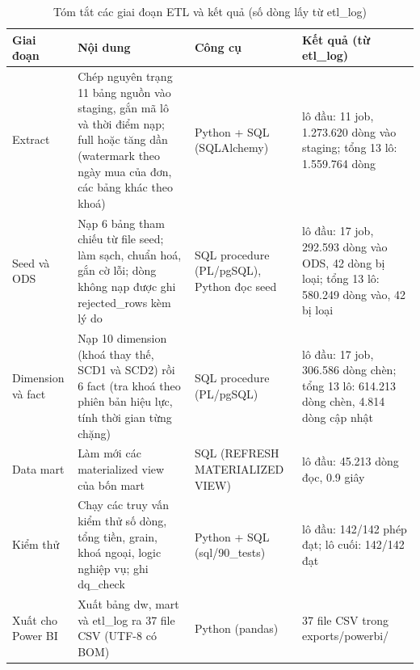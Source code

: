 \begin{table}[htbp]\centering\scriptsize\caption{Tóm tắt các giai đoạn ETL và kết quả (số dòng lấy từ etl\_log)}\label{tab:etl-stages}
\begin{tabular}{p{1.88cm}p{5.13cm}p{2.56cm}p{4.45cm}}\toprule
\textbf{Giai đoạn} & \textbf{Nội dung} & \textbf{Công cụ} & \textbf{Kết quả (từ etl\_log)}\\\midrule
Extract & Chép nguyên trạng 11 bảng nguồn vào staging, gắn mã lô và thời điểm nạp; full hoặc tăng dần (watermark theo ngày mua của đơn, các bảng khác theo khoá) & Python + SQL (SQLAlchemy) & lô đầu: 11 job, 1.273.620 dòng vào staging; tổng 13 lô: 1.559.764 dòng\\
Seed và ODS & Nạp 6 bảng tham chiếu từ file seed; làm sạch, chuẩn hoá, gắn cờ lỗi; dòng không nạp được ghi rejected\_rows kèm lý do & SQL procedure (PL/pgSQL), Python đọc seed & lô đầu: 17 job, 292.593 dòng vào ODS, 42 dòng bị loại; tổng 13 lô: 580.249 dòng vào, 42 bị loại\\
Dimension và fact & Nạp 10 dimension (khoá thay thế, SCD1 và SCD2) rồi 6 fact (tra khoá theo phiên bản hiệu lực, tính thời gian từng chặng) & SQL procedure (PL/pgSQL) & lô đầu: 17 job, 306.586 dòng chèn; tổng 13 lô: 614.213 dòng chèn, 4.814 dòng cập nhật\\
Data mart & Làm mới các materialized view của bốn mart & SQL (REFRESH MATERIALIZED VIEW) & lô đầu: 45.213 dòng đọc, 0.9 giây\\
Kiểm thử & Chạy các truy vấn kiểm thử số dòng, tổng tiền, grain, khoá ngoại, logic nghiệp vụ; ghi dq\_check & Python + SQL (sql/90\_tests) & lô đầu: 142/142 phép đạt; lô cuối: 142/142 đạt\\
Xuất cho Power BI & Xuất bảng dw, mart và etl\_log ra 37 file CSV (UTF-8 có BOM) & Python (pandas) & 37 file CSV trong exports/powerbi/\\
\bottomrule\end{tabular}\end{table}

